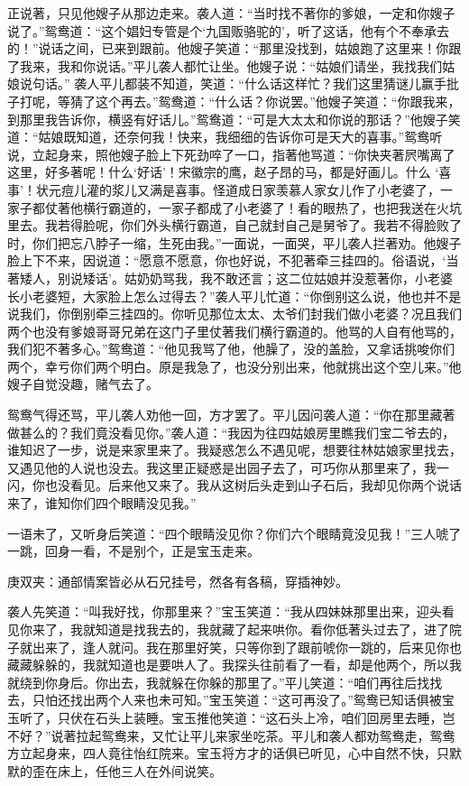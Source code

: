 \begin{parag}
    正说著，只见他嫂子从那边走来。袭人道：“当时找不著你的爹娘，一定和你嫂子说了。”鸳鸯道：“这个娼妇专管是个‘九国贩骆驼的’，听了这话，他有个不奉承去的！”说话之间，已来到跟前。他嫂子笑道：“那里没找到，姑娘跑了这里来！你跟了我来，我和你说话。”平儿袭人都忙让坐。他嫂子说：“姑娘们请坐，我找我们姑娘说句话。” 袭人平儿都装不知道，笑道：“什么话这样忙？我们这里猜谜儿赢手批子打呢，等猜了这个再去。”鸳鸯道：“什么话？你说罢。”他嫂子笑道：“你跟我来，到那里我告诉你，横竖有好话儿。”鸳鸯道：“可是大太太和你说的那话？”他嫂子笑道：“姑娘既知道，还奈何我！快来，我细细的告诉你可是天大的喜事。”鸳鸯听说，立起身来，照他嫂子脸上下死劲啐了一口，指著他骂道：“你快夹著屄嘴离了这里，好多著呢！什么‘好话’！宋徽宗的鹰，赵子昂的马，都是好画儿。什么 ‘喜事’！状元痘儿灌的浆儿又满是喜事。怪道成日家羡慕人家女儿作了小老婆了，一家子都仗著他横行霸道的，一家子都成了小老婆了！看的眼热了，也把我送在火坑里去。我若得脸呢，你们外头横行霸道，自己就封自己是舅爷了。我若不得脸败了时，你们把忘八脖子一缩，生死由我。”一面说，一面哭，平儿袭人拦著劝。他嫂子脸上下不来，因说道：“愿意不愿意，你也好说，不犯著牵三挂四的。俗语说，‘当著矮人，别说矮话’。姑奶奶骂我，我不敢还言；这二位姑娘并没惹著你，小老婆长小老婆短，大家脸上怎么过得去？”袭人平儿忙道：“你倒别这么说，他也并不是说我们，你倒别牵三挂四的。你听见那位太太、太爷们封我们做小老婆？况且我们两个也没有爹娘哥哥兄弟在这门子里仗著我们横行霸道的。他骂的人自有他骂的，我们犯不著多心。”鸳鸯道：“他见我骂了他，他臊了，没的盖脸，又拿话挑唆你们两个，幸亏你们两个明白。原是我急了，也没分别出来，他就挑出这个空儿来。”他嫂子自觉没趣，赌气去了。
\end{parag}


\begin{parag}
    鸳鸯气得还骂，平儿袭人劝他一回，方才罢了。平儿因问袭人道：“你在那里藏著做甚么的？我们竟没看见你。”袭人道：“我因为往四姑娘房里瞧我们宝二爷去的，谁知迟了一步，说是来家里来了。我疑惑怎么不遇见呢，想要往林姑娘家里找去，又遇见他的人说也没去。我这里正疑惑是出园子去了，可巧你从那里来了，我一闪，你也没看见。后来他又来了。我从这树后头走到山子石后，我却见你两个说话来了，谁知你们四个眼睛没见我。”
\end{parag}


\begin{parag}
    一语未了，又听身后笑道：“四个眼睛没见你？你们六个眼睛竟没见我！”三人唬了一跳，回身一看，不是别个，正是宝玉走来。\begin{note}庚双夹：通部情案皆必从石兄挂号，然各有各稿，穿插神妙。\end{note}袭人先笑道：“叫我好找，你那里来？”宝玉笑道：“我从四妹妹那里出来，迎头看见你来了，我就知道是找我去的，我就藏了起来哄你。看你低著头过去了，进了院子就出来了，逢人就问。我在那里好笑，只等你到了跟前唬你一跳的，后来见你也藏藏躲躲的，我就知道也是要哄人了。我探头往前看了一看，却是他两个，所以我就绕到你身后。你出去，我就躲在你躲的那里了。”平儿笑道：“咱们再往后找找去，只怕还找出两个人来也未可知。”宝玉笑道：“这可再没了。”鸳鸯已知话俱被宝玉听了，只伏在石头上装睡。宝玉推他笑道：“这石头上冷，咱们回房里去睡，岂不好？”说著拉起鸳鸯来，又忙让平儿来家坐吃茶。平儿和袭人都劝鸳鸯走，鸳鸯方立起身来，四人竟往怡红院来。宝玉将方才的话俱已听见，心中自然不快，只默默的歪在床上，任他三人在外间说笑。
\end{parag}


